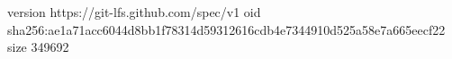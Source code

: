 version https://git-lfs.github.com/spec/v1
oid sha256:ae1a71acc6044d8bb1f78314d59312616cdb4e7344910d525a58e7a665eecf22
size 349692

